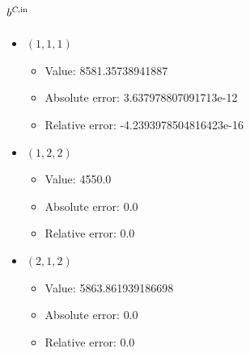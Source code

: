 \documentclass{article}%
\begin{document}
\subsection{$b^{\textsl{C},\text{in}}$}%
\begin{itemize}%
	\item $(1, 1, 1)$%
	\begin{itemize}%
		\item Value: 8581.35738941887%
		\item Absolute error: 3.637978807091713e-12%
		\item Relative error: -4.2393978504816423e-16%
	\end{itemize}%
	\item $(1, 2, 2)$%
	\begin{itemize}%
		\item Value: 4550.0%
		\item Absolute error: 0.0%
		\item Relative error: 0.0%
	\end{itemize}%
	\item $(2, 1, 2)$%
	\begin{itemize}%
		\item Value: 5863.861939186698%
		\item Absolute error: 0.0%
		\item Relative error: 0.0%
	\end{itemize}%
\end{itemize}%
\end{document}
